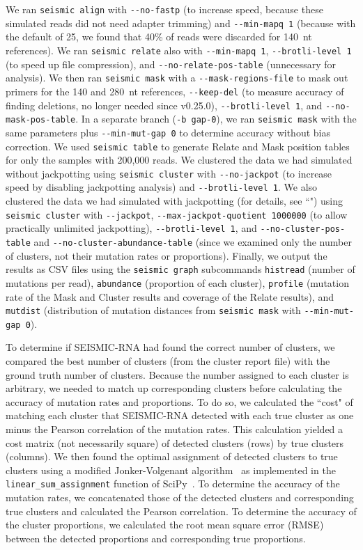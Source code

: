 \documentclass[unnumsec,webpdf,contemporary,large]{oup-authoring-template}%
\theoremstyle{thmstyleone}%
\theoremstyle{thmstyletwo}%
\theoremstyle{thmstylethree}%
\begin{document}
We ran \verb|seismic align| with \verb|--no-fastp| (to increase speed, because these simulated reads did not need adapter trimming) and \verb|--min-mapq 1| (because with the default of 25, we found that 40\% of reads were discarded for 140~nt references).
We ran \verb|seismic relate| also with \verb|--min-mapq 1|, \verb|--brotli-level 1| (to speed up file compression), and \verb|--no-relate-pos-table| (unnecessary for analysis).
We then ran \verb|seismic mask| with a \verb|--mask-regions-file| to mask out primers for the 140 and 280~nt references, \verb|--keep-del| (to measure accuracy of finding deletions, no longer needed since v0.25.0), \verb|--brotli-level 1|, and \verb|--no-mask-pos-table|.
In a separate branch (\verb|-b gap-0|), we ran \verb|seismic mask| with the same parameters plus \verb|--min-mut-gap 0| to determine accuracy without bias correction.
We used \verb|seismic table| to generate Relate and Mask position tables for only the samples with 200,000 reads.
We clustered the data we had simulated without jackpotting using \verb|seismic cluster| with \verb|--no-jackpot| (to increase speed by disabling jackpotting analysis) and \verb|--brotli-level 1|.
We also clustered the data we had simulated with jackpotting (for details, see ``") using \verb|seismic cluster| with \verb|--jackpot|, \verb|--max-jackpot-quotient 1000000| (to allow practically unlimited jackpotting), \verb|--brotli-level 1|, and \verb|--no-cluster-pos-table| and \verb|--no-cluster-abundance-table| (since we examined only the number of clusters, not their mutation rates or proportions).
Finally, we output the results as CSV files using the \verb|seismic graph| subcommands \verb|histread| (number of mutations per read), \verb|abundance| (proportion of each cluster), \verb|profile| (mutation rate of the Mask and Cluster results and coverage of the Relate results), and \verb|mutdist| (distribution of mutation distances from \verb|seismic mask| with \verb|--min-mut-gap 0|).

To determine if SEISMIC-RNA had found the correct number of clusters, we compared the best number of clusters (from the cluster report file) with the ground truth number of clusters.
Because the number assigned to each cluster is arbitrary, we needed to match up corresponding clusters before calculating the accuracy of mutation rates and proportions.
To do so, we calculated the ``cost" of matching each cluster that SEISMIC-RNA detected with each true cluster as one minus the Pearson correlation of the mutation rates.
This calculation yielded a cost matrix (not necessarily square) of detected clusters (rows) by true clusters (columns).
We then found the optimal assignment of detected clusters to true clusters using a modified Jonker-Volgenant algorithm~\cite{Crouse2016} as implemented in the \verb|linear_sum_assignment| function of SciPy~\cite{Virtanen2020}.
To determine the accuracy of the mutation rates, we concatenated those of the detected clusters and corresponding true clusters and calculated the Pearson correlation.
To determine the accuracy of the cluster proportions, we calculated the root mean square error (RMSE) between the detected proportions and corresponding true proportions.
\end{document}
